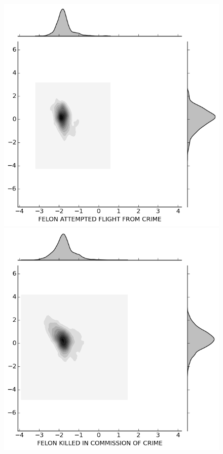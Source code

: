 \documentclass{evanarticle}
\begin{document}
\begin{figure}[H]
  \begin{minipage}[b]{0.30\linewidth}
    \includegraphics[width=\linewidth]{images/subcircum/FELON_ATTEMPTED_FLIGHT_FROM_CRIME.png}
  \end{minipage}
  \quad
  \begin{minipage}[b]{0.30\linewidth}
    \includegraphics[width=\linewidth]{images/subcircum/FELON_KILLED_IN_COMMISSION_OF_CRIME.png}

\end{minipage}
\end{figure}
\end{document}

